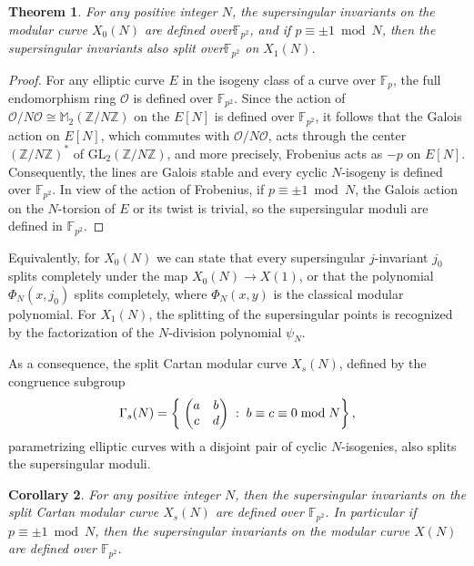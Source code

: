 \documentclass{amsart}
\newcommand{\cO}{\mathcal{O}}
\newcommand{\FF}{\mathbb{F}}
\newcommand{\MM}{\mathbb{M}}
\newcommand{\ZZ}{\mathbb{Z}}
\newcommand{\GL}{\mathrm{GL}}
\newcommand{\isom}{\cong}
\newtheorem{theorem}{Theorem}
\newtheorem{corollary}[theorem]{Corollary}
\begin{document}
\begin{theorem}\label{thm:ss_moduli_field_X0}
For any positive integer $N$, the supersingular invariants on the modular curve $X_0(N)$ are defined over\space\space$\FF_{p^2}$, and if $p \equiv \pm1 \bmod N$, then the supersingular invariants also split over\space\space$\FF_{p^2}$ on $X_1(N)$.
\end{theorem}

\begin{proof}
  For any elliptic curve $E$ in the isogeny class of a curve over $\FF_p$,
  the full endomorphism ring $\cO$ is defined over $\FF_{p^2}$.
  Since the action of $\cO/N\cO \isom \MM_2(\ZZ/N\ZZ)$ on the $E[N]$ is
  defined over $\FF_{p^2}$, it follows that the Galois action on $E[N]$,
  which commutes with $\cO/N\cO$, acts through the center $(\ZZ/N\ZZ)^*$
  of $\GL_2(\ZZ/N\ZZ)$, and more precisely, Frobenius acts as $-p$ on $E[N]$.
  Consequently, the lines are Galois stable and every cyclic $N$-isogeny
  is defined over $\FF_{p^2}$. In view of the action of Frobenius, if
  $p \equiv \pm1 \bmod N$, the Galois action on the $N$-torsion of $E$
  or its twist is trivial, so the supersingular moduli are defined in
  $\FF_{p^2}$.
\end{proof}

 Equivalently, for $X_0(N)$ we can state that every
supersingular $j$-invariant $j_0$ splits completely under the map
$X_0(N) \to X(1)$, or that the polynomial $\Phi_N(x,j_0)$ splits completely,
where $\Phi_N(x,y)$ is the classical modular polynomial.
For $X_1(N)$, the splitting of the supersingular points is recognized
by the factorization of the $N$-division polynomial $\psi_N$.
\vspace{1mm}

As a consequence, the split Cartan modular curve $X_s(N)$, defined by the
congruence subgroup
$$
\Gamma_s(N) = \left\{\;
  \left(\begin{array}{@{}cc@{}}a&b\\c&d\end{array}\right)
  \;:\; b \equiv c \equiv 0 \bmod N \right\},
$$
parametrizing elliptic curves with a disjoint pair of cyclic $N$-isogenies,
also splits the supersingular moduli.

\begin{corollary}
  \label{cor:ss_moduli_field_split_Cartan}
  For any positive integer $N$, then the supersingular invariants on the
  split Cartan modular curve $X_s(N)$ are defined over $\FF_{p^2}$.
  In particular if $p \equiv \pm1 \bmod N$, then the supersingular invariants
  on the modular curve $X(N)$ are defined over $\FF_{p^2}$.
\end{corollary}
\end{document}
